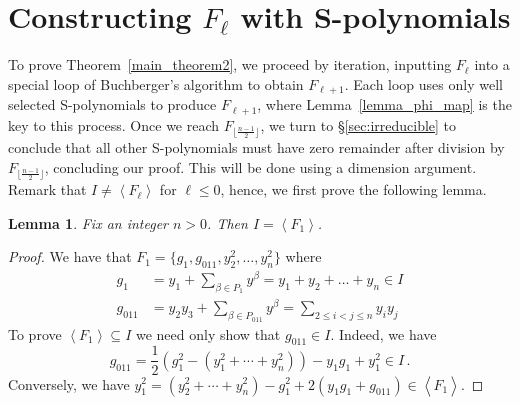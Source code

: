 \documentclass[10pt,a4paper]{article}
\newtheorem{lemma}{Lemma}[section]
\DeclareMathOperator{\la}{\langle}
\DeclareMathOperator{\ra}{\rangle}
\DeclareMathOperator{\sube}{\subseteq}
\begin{document}
\section{\label{proof}Constructing $F_\ell$ with S-polynomials}
To prove Theorem~\ref{main_theorem2}, we proceed by iteration, inputting $F_\ell$ into a special loop of Buchberger's algorithm to obtain $F_{\ell +1}$.
Each loop uses only well selected  S-polynomials to produce $F_{\ell +1}$, where Lemma~\ref{lemma_phi_map} is the key to this process.
Once we reach $F_{ \lfloor \frac{n-1}{2} \rfloor}$, we turn to  \S\ref{sec:irreducible} to conclude that all other S-polynomials must have zero remainder  after division by $F_{ \lfloor \frac{n-1}{2} \rfloor}$, concluding our proof. This will be done using a dimension argument.
Remark that $I\ne \la F_\ell \ra$ for $\ell\le 0$, hence, we first prove the following lemma.
\begin{lemma} \label{F_ellsequence}
	Fix an integer $n>0$. Then $I=\la F_1\ra$.
\end{lemma}
\begin{proof} We have that $F_1 = \{g_1, g_{011}, y_2^2, \dots, y_n^2 \}$ where
 	\begin{align*}
 		g_{1} &= y_1 + \sum_{\beta \in P_{1}} y^{\beta} = y_1 + y_2 + \dots + y_n \in I\\
 		g_{011} &= y_2y_3 + \sum_{\beta \in P_{011}}y^\beta = \sum_{2 \leq i < j \leq n}y_iy_j 
	\end{align*}
	To prove {$\la F_1 \ra \sube I $} we need only show that $g_{011} \in I$. Indeed, we have
	$$  g_{011} = \frac{1}{2}(g_1^2 - (y_1^2 + \cdots +y_n^2)) - y_1g_1 + y_1^2  \in I\,.$$
	Conversely, we have   $ y_1^2 =(y_2^2 + \cdots +y_n^2) -g_1^2  + 2(y_1g_1 + g_{011}) \in \la F_1 \ra$.
\end{proof}
\end{document}
